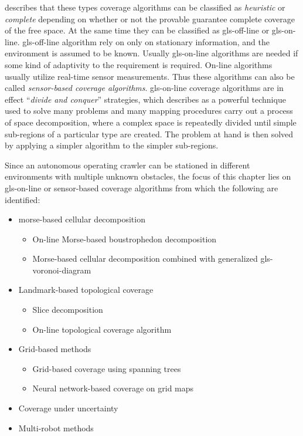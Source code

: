 \citet{galceran_towards_2014} describes that these types coverage algorithms can be classified as \emph{heuristic} or
\emph{complete} depending on whether or not the provable guarantee complete coverage of the free space. At the same time
they can be classified as \gls{gls-off-line} or \gls{gls-on-line}. \gls{gls-off-line} algorithm rely on only on
stationary information, and the environment is assumed to be known. Usually \gls{gls-on-line} algorithms are needed if
some kind of adaptivity to the requirement is required. On-line algorithms usually utilize real-time sensor
measurements. Thus these algorithms can also be called \emph{sensor-based coverage algorithms}. \gls{gls-on-line}
coverage algorithms are in effect ``\emph{divide and conquer}'' strategies, which \citet{wong_complete_2004} describes
as a powerful technique used to solve many problems and many mapping procedures carry out a process of space
decomposition, where a complex space is repeatedly divided until simple sub-regions of a particular type are created. The
problem at hand is then solved by applying a simpler algorithm to the simpler sub-regions.

Since an autonomous operating crawler can be stationed in different environments with multiple unknown obstacles, the
focus of this chapter lies on \gls{gls-on-line} or sensor-based coverage algorithms from which the following are
identified:
\begin{itemize}
	\item morse-based cellular decomposition
	\begin{itemize}
		\item On-line Morse-based boustrophedon decomposition
		\item Morse-based cellular decomposition combined with generalized \gls{gls-voronoi-diagram}
	\end{itemize}
	\item Landmark-based topological coverage
	\begin{itemize}
		\item Slice decomposition
		\item On-line topological coverage algorithm
	\end{itemize}
	\item Grid-based methods
	\begin{itemize}
		\item Grid-based coverage using spanning trees
		\item Neural network-based coverage on grid maps
	\end{itemize}
	\item Coverage under uncertainty
	\item Multi-robot methods
\end{itemize}

